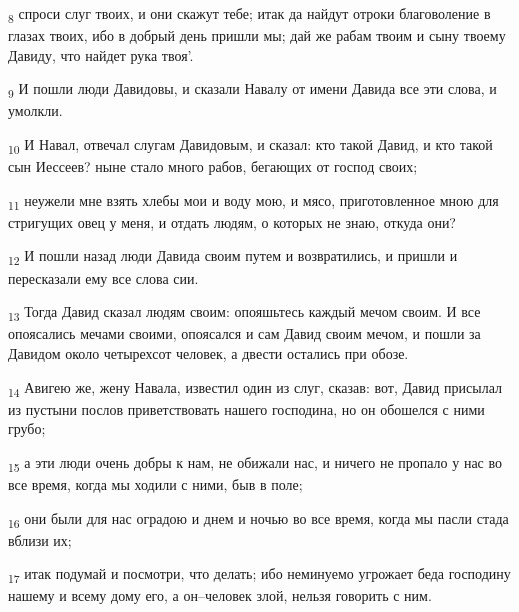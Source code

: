 \begin{tcolorbox}
\textsubscript{8} спроси слуг твоих, и они скажут тебе; итак да найдут отроки благоволение в глазах твоих, ибо в добрый день пришли мы; дай же рабам твоим и сыну твоему Давиду, что найдет рука твоя'.
\end{tcolorbox}
\begin{tcolorbox}
\textsubscript{9} И пошли люди Давидовы, и сказали Навалу от имени Давида все эти слова, и умолкли.
\end{tcolorbox}
\begin{tcolorbox}
\textsubscript{10} И Навал, отвечал слугам Давидовым, и сказал: кто такой Давид, и кто такой сын Иессеев? ныне стало много рабов, бегающих от господ своих;
\end{tcolorbox}
\begin{tcolorbox}
\textsubscript{11} неужели мне взять хлебы мои и воду мою, и мясо, приготовленное мною для стригущих овец у меня, и отдать людям, о которых не знаю, откуда они?
\end{tcolorbox}
\begin{tcolorbox}
\textsubscript{12} И пошли назад люди Давида своим путем и возвратились, и пришли и пересказали ему все слова сии.
\end{tcolorbox}
\begin{tcolorbox}
\textsubscript{13} Тогда Давид сказал людям своим: опояшьтесь каждый мечом своим. И все опоясались мечами своими, опоясался и сам Давид своим мечом, и пошли за Давидом около четырехсот человек, а двести остались при обозе.
\end{tcolorbox}
\begin{tcolorbox}
\textsubscript{14} Авигею же, жену Навала, известил один из слуг, сказав: вот, Давид присылал из пустыни послов приветствовать нашего господина, но он обошелся с ними грубо;
\end{tcolorbox}
\begin{tcolorbox}
\textsubscript{15} а эти люди очень добры к нам, не обижали нас, и ничего не пропало у нас во все время, когда мы ходили с ними, быв в поле;
\end{tcolorbox}
\begin{tcolorbox}
\textsubscript{16} они были для нас оградою и днем и ночью во все время, когда мы пасли стада вблизи их;
\end{tcolorbox}
\begin{tcolorbox}
\textsubscript{17} итак подумай и посмотри, что делать; ибо неминуемо угрожает беда господину нашему и всему дому его, а он--человек злой, нельзя говорить с ним.
\end{tcolorbox}
